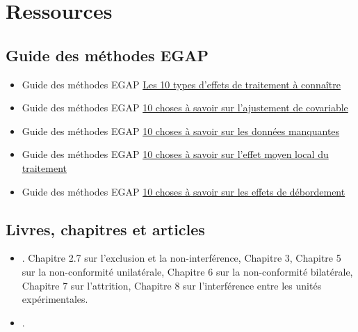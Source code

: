 \documentclass[12pt,]{book}
\begin{document}
\hypertarget{ressources-4}{%
\section{Ressources}\label{ressources-4}}

\hypertarget{guide-des-muxe9thodes-egap-4}{%
\subsection{Guide des méthodes EGAP}\label{guide-des-muxe9thodes-egap-4}}

\begin{itemize}
\item
  Guide des méthodes EGAP \href{https://egap.org/resource/10-types-of-treatment-effect-you-should-know-about/}{Les 10 types d'effets de traitement à connaître}
\item
  Guide des méthodes EGAP \href{https://egap.org/resource/10-things-to-know-about-covariate-adjustment/}{10 choses à savoir sur l'ajustement de covariable}
\item
  Guide des méthodes EGAP \href{https://egap.org/resource/10-things-to-know-about-missing-data/}{10 choses à savoir sur les données manquantes}
\item
  Guide des méthodes EGAP \href{https://egap.org/resource/10-things-to-know-about-the-local-average-treatment-effect/}{10 choses à savoir sur l'effet moyen local du traitement}
\item
  Guide des méthodes EGAP \href{https://egap.org/resource/10-things-to-know-about-spillovers/}{10 choses à savoir sur les effets de débordement}
\end{itemize}

\hypertarget{livres-chapitres-et-articles-3}{%
\subsection{Livres, chapitres et articles}\label{livres-chapitres-et-articles-3}}

\begin{itemize}
\item
  \autocite{gerber_field_2012}. Chapitre 2.7 sur l'exclusion et la non-interférence, Chapitre 3, Chapitre 5 sur la non-conformité unilatérale, Chapitre 6 sur la non-conformité bilatérale, Chapitre 7 sur l'attrition, Chapitre 8 sur l'interférence entre les unités expérimentales.
\item
  \autocite{bowers2020causality}.
\end{itemize}
\end{document}
